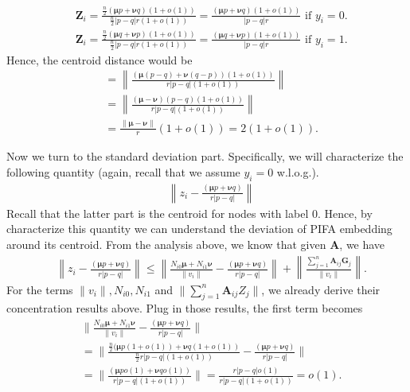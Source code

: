 \documentclass{article} \usepackage{iclr2022_conference,times}
\begin{document}
\begin{align}
	& \mathbf{Z}_i = \frac{\frac{n}{2}(\boldsymbol{\mu}p+\boldsymbol{\nu}q)(1+o(1))}{\frac{n}{2}|p-q|r(1+o(1))} = \frac{(\boldsymbol{\mu}p+\boldsymbol{\nu}q)(1+o(1))}{|p-q|r}\text{ if }y_i=0.\\
	& \mathbf{Z}_i = \frac{\frac{n}{2}(\boldsymbol{\mu}q+\boldsymbol{\nu}p)(1+o(1))}{\frac{n}{2}|p-q|r(1+o(1))} = \frac{(\boldsymbol{\mu}q+\boldsymbol{\nu}p)(1+o(1))}{|p-q|r}\text{ if }y_i=1.
\end{align}
Hence, the centroid distance would be
\begin{align}
	& = \left\| \frac{(\boldsymbol{\mu}(p-q)+\boldsymbol{\nu}(q-p))(1+o(1))}{ r|p-q|(1+o(1))}\right\| \\
	& = \left\| \frac{(\boldsymbol{\mu}-\boldsymbol{\nu})(p-q)(1+o(1))}{ r|p-q|(1+o(1))}\right\| \\
	& = \frac{\|\boldsymbol{\mu}-\boldsymbol{\nu}\|}{r}(1+o(1)) = 2(1+o(1)).
\end{align}

Now we turn to the standard deviation part. Specifically, we will characterize the following quantity (again, recall that we assume $y_i=0$ w.l.o.g.).
\begin{align}
	&\left\| z_i - \frac{(\boldsymbol{\mu}p+\boldsymbol{\nu}q)}{r|p-q|}\right\|
\end{align}
Recall that the latter part is the centroid for nodes with label $0$. Hence, by characterize this quantity we can understand the deviation of PIFA embedding around its centroid. From the analysis above, we know that given $\mathbf{A}$, we have
\begin{align}
	& \left\| z_i - \frac{(\boldsymbol{\mu}p+\boldsymbol{\nu}q)}{r|p-q|}\right\| \leq \left\| \frac{N_{i0}\boldsymbol{\mu}+N_{i1}\boldsymbol{\nu}}{\|v_i\|} - \frac{(\boldsymbol{\mu}p+\boldsymbol{\nu}q)}{r|p-q|}\right\| + \left\| \frac{\sum_{j=1}^n\mathbf{A}_{ij}\mathbf{G}_j}{\|v_i\|} \right\|.
\end{align}
For the terms $\|v_i\|, N_{i0}, N_{i1}$ and $\|\sum_{j=1}^n\mathbf{A}_{ij}Z_j\|$, we already derive their concentration results above. Plug in those results, the first term becomes
\begin{align}
	& \| \frac{N_{i0}\boldsymbol{\mu}+N_{i1}\boldsymbol{\nu}}{\|v_i\|} - \frac{(\boldsymbol{\mu}p+\boldsymbol{\nu}q)}{r|p-q|}\| \\
	& = \| \frac{ \frac{n}{2}(\boldsymbol{\mu}p(1+o(1))+\boldsymbol{\nu}q(1+o(1))}{\frac{n}{2}r|p-q|(1+o(1))} - \frac{(\boldsymbol{\mu}p+\boldsymbol{\nu}q)}{r|p-q|} \| \\
	& =  \| \frac{ (\boldsymbol{\mu}po(1)+\boldsymbol{\nu}qo(1))}{r|p-q|(1+o(1))}\| = \frac{r|p-q|o(1)}{r|p-q|(1+o(1))} = o(1).
\end{align}
\end{document}
